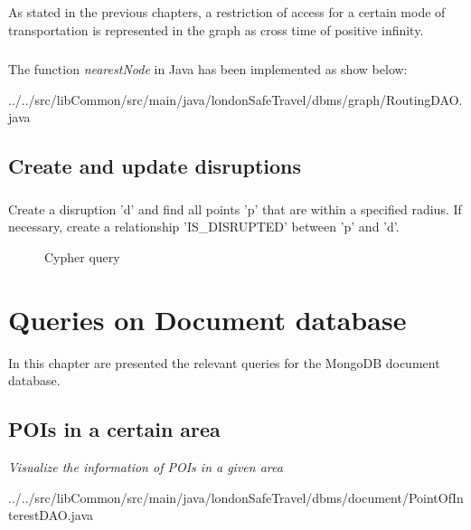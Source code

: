 \paragraph{}
As stated in the previous chapters, a restriction of access for a certain mode of transportation is represented in the graph as cross time of positive infinity.

\paragraph{}
The function \textit{nearestNode} in Java has been implemented as show below:

{../../src/libCommon/src/main/java/londonSafeTravel/dbms/graph/RoutingDAO.java}

\section{Create and update disruptions}
\paragraph{}
Create a disruption 'd' and find all points 'p' that are within a specified radius. If necessary, create a relationship 'IS\_DISRUPTED' between 'p' and 'd'.
\begin{figure}[H]
	
	\caption{Cypher query}
\end{figure}

\chapter{Queries on Document database}
In this chapter are presented the relevant queries for the
MongoDB document database.

\section{POIs in a certain area}
\textit{Visualize the information of POIs in a given area}


{../../src/libCommon/src/main/java/londonSafeTravel/dbms/document/PointOfInterestDAO.java}

